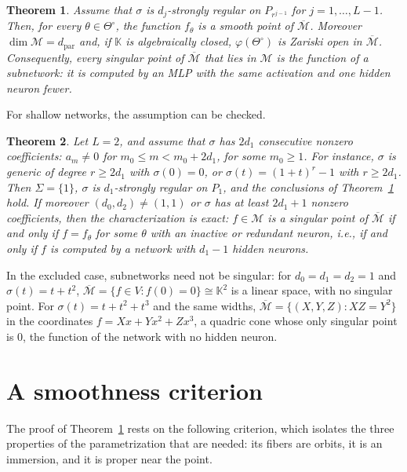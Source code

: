 \documentclass[11pt]{article}
\newtheorem{maintheorem}{Theorem}
\theoremstyle{definition}
\theoremstyle{remark}
\newcommand{\K}{\mathbb{K}}
\newcommand{\M}{\mathcal{M}}
\newcommand{\Mbar}{\overline{\M}}
\newcommand{\dpar}{d_{\mathrm{par}}}
\newcommand{\To}{\Theta^{\circ}}
\begin{document}
\begin{maintheorem}\label{thm:main}
Assume that $\sigma$ is $d_j$-strongly regular on $P_{r^{j-1}}$ for $j=1,\dots,L-1$. Then, for every $\theta\in\To$, the function $f_\theta$ is a smooth point of $\Mbar$. Moreover $\dim\M=\dpar$ and, if $\K$ is algebraically closed, $\varphi(\To)$ is Zariski open in $\Mbar$. Consequently, every singular point of $\Mbar$ that lies in $\M$ is the function of a subnetwork: it is computed by an MLP with the same activation and one hidden neuron fewer.
\end{maintheorem}

For shallow networks, the assumption can be checked.

\begin{maintheorem}\label{thm:shallow}
Let $L=2$, and assume that $\sigma$ has $2d_1$ consecutive nonzero coefficients: $a_m\ne0$ for $m_0\le m<m_0+2d_1$, for some $m_0\ge1$. For instance, $\sigma$ is generic of degree $r\ge2d_1$ with $\sigma(0)=0$, or $\sigma(t)=(1+t)^r-1$ with $r\ge2d_1$. Then $\Sigma=\{1\}$, $\sigma$ is $d_1$-strongly regular on $P_1$, and the conclusions of Theorem~\ref{thm:main} hold. If moreover $(d_0,d_2)\ne(1,1)$ or $\sigma$ has at least $2d_1+1$ nonzero coefficients, then the characterization is exact: $f\in\M$ is a singular point of $\Mbar$ if and only if $f=f_\theta$ for some $\theta$ with an inactive or redundant neuron, i.e., if and only if $f$ is computed by a network with $d_1-1$ hidden neurons.
\end{maintheorem}

In the excluded case, subnetworks need not be singular: for $d_0=d_1=d_2=1$ and $\sigma(t)=t+t^2$, $\Mbar=\{f\in V:f(0)=0\}\cong\K^2$ is a linear space, with no singular point. For $\sigma(t)=t+t^2+t^3$ and the same widths, $\Mbar=\{(X,Y,Z):XZ=Y^2\}$ in the coordinates $f=Xx+Yx^2+Zx^3$, a quadric cone whose only singular point is $0$, the function of the network with no hidden neuron.

\section{A smoothness criterion}

The proof of Theorem~\ref{thm:main} rests on the following criterion, which isolates the three properties of the parametrization that are needed: its fibers are orbits, it is an immersion, and it is proper near the point.
\end{document}
